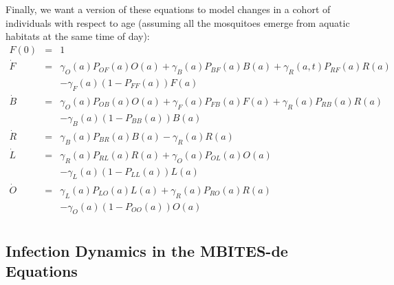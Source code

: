 \documentclass{article}
\begin{document}
Finally, we want a version of these equations to model changes in a cohort of individuals with respect to age (assuming all the mosquitoes emerge from aquatic habitats at the same time of day): 
%
\begin{equation}\begin{array}{rcl}
F(0) &=& 1 \\ 
%
{\dot F}&=& 
\gamma_O(a) P_{OF}(a) O(a) 
+ \gamma_B(a) P_{BF}(a) B(a) 
 + \gamma_R(a,t) P_{RF}(a) R(a)
\\ &&
- \gamma_F(a) (1 - P_{FF}(a)) F(a) 
 \\ 
%
%
{\dot B} &=&  \gamma_O(a) P_{OB}(a) O(a) + \gamma_F(a) P_{FB}(a) F(a) 
+ \gamma_R(a) P_{RB}(a) R(a) \\ && 
- \gamma_B(a) (1-P_{BB}(a)) B(a)
\\
%
{\dot R} &=&  \gamma_B(a) P_{BR}(a) B(a) - \gamma_R(a) R(a)\\ 
%
{\dot L}&=& \gamma_R(a) P_{RL}(a) R(a) + 
\gamma_O(a) P_{OL}(a) O(a) \\&&
- \gamma_L(a) (1 - P_{LL}(a)) L(a)
\\ 
%
{\dot O} &=& \gamma_L(a) P_{LO}(a) L(a) 
+ \gamma_R(a) P_{RO}(a) R(a)  
\\&& 
- \gamma_O(a) (1 - P_{OO}(a)) O(a)
\\ 
%
\end{array}\end{equation}

\subsection{Infection Dynamics in the MBITES-de Equations}
\end{document}
